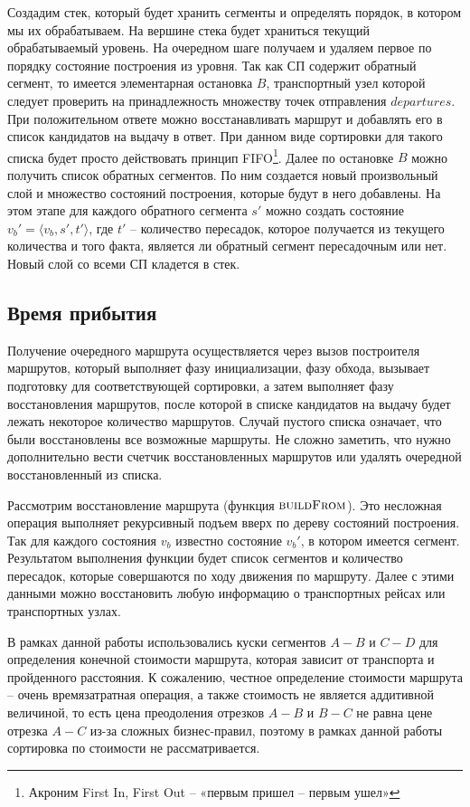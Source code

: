 Создадим стек, который будет хранить сегменты и определять порядок, в котором мы их обрабатываем. На вершине стека будет храниться текущий обрабатываемый уровень. На очередном шаге получаем и удаляем первое по порядку состояние построения из уровня. Так как СП содержит обратный сегмент, то имеется элементарная остановка $B$, транспортный узел которой следует проверить на принадлежность множеству точек отправления $departures$. При положительном ответе можно восстанавливать маршрут и добавлять его в список кандидатов на выдачу в ответ. При данном виде сортировки для такого списка будет просто действовать принцип FIFO\footnote{Акроним First In, First Out -- «первым пришел -- первым ушел»}. Далее по остановке $B$ можно получить список обратных сегментов. По ним создается новый произвольный слой и множество состояний построения, которые будут в него добавлены. На этом этапе для каждого обратного сегмента $s'$ можно создать состояние $v_b'=\langle v_b, s', t' \rangle$, где $t'$ -- количество пересадок, которое получается из текущего количества и того факта, является ли обратный сегмент пересадочным или нет. Новый слой со всеми СП кладется в стек.

\FloatBarrier
\subsection{Время прибытия}
Получение очередного маршрута осуществляется через вызов построителя маршрутов, который выполняет фазу инициализации, фазу обхода, вызывает подготовку для соответствующей сортировки, а затем выполняет фазу восстановления маршрутов, после которой в списке кандидатов на выдачу будет лежать некоторое количество маршрутов. Случай пустого списка означает, что были восстановлены все возможные маршруты. Не сложно заметить, что нужно дополнительно вести счетчик восстановленных маршрутов или удалять очередной восстановленный из списка.

Рассмотрим восстановление маршрута (функция $\Call{buildFrom}{}$). Это несложная операция выполняет рекурсивный подъем вверх по дереву состояний построения. Так для каждого состояния $v_b$ известно состояние $v_b'$, в котором имеется сегмент. Результатом выполнения функции будет список сегментов и количество пересадок, которые совершаются по ходу движения по маршруту. Далее с этими данными можно восстановить любую информацию о транспортных рейсах или транспортных узлах.

В рамках данной работы использовались куски сегментов $A-B$ и $C-D$ для определения конечной стоимости маршрута, которая зависит от транспорта и пройденного расстояния. К сожалению, честное определение стоимости маршрута -- очень времязатратная операция, а также стоимость не является аддитивной величиной, то есть цена преодоления отрезков $A-B$ и $B-C$ не равна цене отрезка $A-C$ из-за сложных бизнес-правил, поэтому в рамках данной работы сортировка по стоимости не рассматривается.

